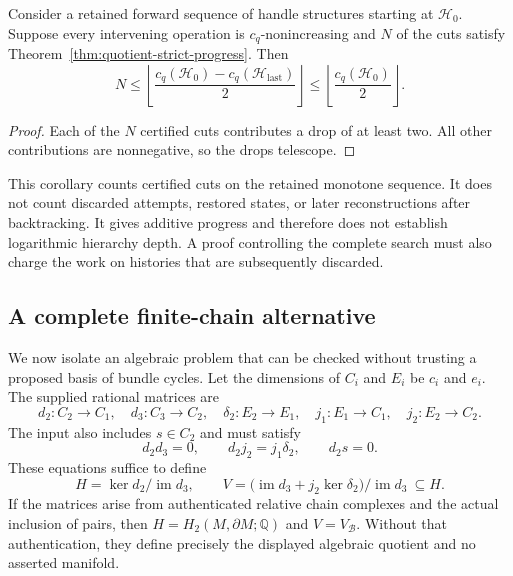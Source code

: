 \begin{corollary}
\label{cor:quotient-retained-count}
Consider a retained forward sequence of handle structures starting at
$\mathcal H_0$. Suppose every intervening operation is
$c_q$-nonincreasing and $N$ of the cuts satisfy
Theorem~\ref{thm:quotient-strict-progress}. Then
\[
 N\leq
 \left\lfloor\frac{c_q(\mathcal H_0)-c_q(\mathcal H_{\mathrm{last}})}2
       \right\rfloor
 \leq \left\lfloor\frac{c_q(\mathcal H_0)}2\right\rfloor .
\]
\end{corollary}

\begin{proof}
Each of the $N$ certified cuts contributes a drop of at least two.
All other contributions are nonnegative, so the drops telescope.
\end{proof}

This corollary counts certified cuts on the retained monotone sequence.
It does not count discarded attempts, restored states, or later
reconstructions after backtracking. It gives additive progress and
therefore does not establish logarithmic hierarchy depth. A proof
controlling the complete search must also charge the work on histories
that are subsequently discarded.

\subsection{A complete finite-chain alternative}

We now isolate an algebraic problem that can be checked without trusting
a proposed basis of bundle cycles. Let the dimensions of $C_i$ and $E_i$
be $c_i$ and $e_i$. The supplied rational matrices are
\[
 d_2:C_2\longrightarrow C_1,\quad
 d_3:C_3\longrightarrow C_2,\quad
 \delta_2:E_2\longrightarrow E_1,\quad
 j_1:E_1\longrightarrow C_1,\quad
 j_2:E_2\longrightarrow C_2.
\]
The input also includes $s\in C_2$ and must satisfy
\begin{equation}
 \label{eq:quotient-input-contract}
 d_2d_3=0,\qquad d_2j_2=j_1\delta_2,\qquad d_2s=0.
\end{equation}
These equations suffice to define
\[
 H=\ker d_2/\operatorname{im}d_3,\qquad
 V=\bigl(\operatorname{im}d_3+j_2\ker\delta_2\bigr)/
       \operatorname{im}d_3\ \subseteq H.
\]
If the matrices arise from authenticated relative chain complexes and
the actual inclusion of pairs, then $H=H_2(M,\partial M;\mathbb Q)$ and
$V=V_{\mathcal B}$. Without that authentication, they define precisely
the displayed algebraic quotient and no asserted manifold.

